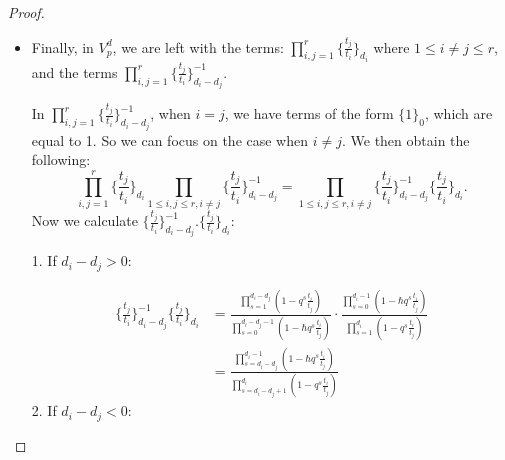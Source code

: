 \documentclass{amsart}
\begin{document}
\begin{proof}
\begin{itemize}
       Now, we examine $\mathcal{B}_{-q^{-1}\hbar}(I(t;q,Q)_{\arrowvert_{p}})$. In $\mathcal{B}_{y}(I(t;q,Q)_{\arrowvert_{p}})$, we have the terms: 
       \[
       \frac{\prod_{i=1}^r \prod_{j=r+1}^n\prod_{s=1}^{d_i}(1+yq^{s}\frac{t_i}{t_j})}{\prod_{i=1}^r \prod_{j=r+1}^n\prod_{s=1}^{d_i}(1-q^{s}\frac{t_i}{t_j})} 
       \]
       Hence, the corresponding term in $\mathcal{B}_{q^{-1}y}(I(t;q,Q)_{\arrowvert_{p}})$ will be:

       \[
       \frac{\prod_{i=1}^r \prod_{j=r+1}^n\prod_{s=1}^{d_i}(1+yq^{s-1}\frac{t_i}{t_j})}{\prod_{i=1}^r \prod_{j=r+1}^n\prod_{s=1}^{d_i}(1-q^{s}\frac{t_i}{t_j})} = \frac{\prod_{i=1}^r \prod_{j=r+1}^n\prod_{s=0}^{d_i-1}(1+yq^{s}\frac{t_i}{t_j})}{\prod_{i=1}^r \prod_{j=r+1}^n\prod_{s=1}^{d_i}(1-q^{s}\frac{t_i}{t_j})}
       \]
       Thus, after the change of variables $y=-\hbar$, the terms in $V_p^d$ and $\mathcal{B}_{-q^{-1}\hbar}(I(t;q,Q)_{\arrowvert_{p}})$ are also equal.

       \item Finally, in $V_p^d$, we are left with the terms: $\prod_{i,j=1}^r\{\frac{t_j}{t_i}\}_{d_i}$ where $1 \leq i \ne j \leq r$, and the terms $\prod_{i,j=1}^r\{\frac{t_j}{t_i}\}_{d_i-d_j}^{-1}$. 
       
       In $\prod_{i,j=1}^r\{\frac{t_j}{t_i}\}_{d_i-d_j}^{-1}$, when $i=j$, we have terms of the form $\{1\}_0$, which are equal to 1. So we can focus on the case when $i \ne j$. We then obtain the following:
       \[
\prod_{i,j=1}^r\{\frac{t_j}{t_i}\}_{d_i}\prod_{1 \le i,j \le r, i \ne j}\{\frac{t_j}{t_i}\}_{d_i-d_j}^{-1} = \prod_{1 \le i,j \le r, i \ne j}\{\frac{t_j}{t_i}\}_{d_i-d_j}^{-1}\{\frac{t_j}{t_i}\}_{d_i}.
       \]
       Now we calculate $\{\frac{t_j}{t_i}\}_{d_i-d_j}^{-1}.\{\frac{t_j}{t_i}\}_{d_i}$:
       
        1. If $d_i-d_j > 0:$

        \begin{align*}
           \{\frac{t_j}{t_i}\}_{d_i-d_j}^{-1}\{\frac{t_j}{t_i}\}_{d_i} &= \frac{\prod_{s=1}^{d_i-d_j}(1-q^s\frac{t_i}{t_j})}{\prod_{s=0}^{d_i-d_j-1}(1-\hbar q^s \frac{t_i}{t_j})} \cdot\frac{\prod_{s=0}^{d_i-1}(1-\hbar q^s\frac{t_i}{t_j})}{\prod_{s=1}^{d_i}(1-q^s \frac{t_i}{t_j})}  \\&= \frac{\prod_{s=d_i-d_j}^{d_i-1}(1-\hbar q^s \frac{t_i}{t_j})}{\prod_{s=d_i-d_j+1}^{d_i}(1-q^s \frac{t_i}{t_j})}
        \end{align*}
        2. If $d_i-d_j < 0:$


\end{itemize}
\end{proof}
\end{document}
